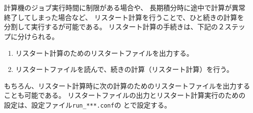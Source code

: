\section{\SecAdvanceRestart}\label{sec:restart}

計算機のジョブ実行時間に制限がある場合や、
長期積分時に途中で計算が異常終了してしまった場合など、
リスタート計算を行うことで、ひと続きの計算を分割して実行するが可能である。
リスタート計算の手続きは、下記の２ステップに分けられる。
\begin{enumerate}
\item リスタート計算のためのリスタートファイルを出力する。
\item リスタートファイルを読んで、続きの計算（リスタート計算）を行う。
\end{enumerate}
もちろん、リスタート計算時に次の計算のためのリスタートファイルを出力することも可能である。
リスタートファイルの出力とリスタート計算実行のための設定は、設定ファイル\verb|run_***.conf|の
とで設定する。\\

